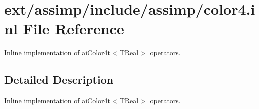 \hypertarget{color4_8inl}{\section{ext/assimp/include/assimp/color4.inl File Reference}
\label{color4_8inl}
}


Inline implementation of ai\-Color4t$<$\-T\-Real$>$ operators.  




\subsection{Detailed Description}
Inline implementation of ai\-Color4t$<$\-T\-Real$>$ operators. 